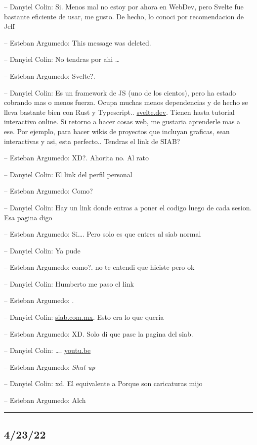 -- Danyiel Colin: Si. Menos mal no estoy por ahora en WebDev, pero
Svelte fue bastante eficiente de usar, me gusto. De hecho, lo conoci por
recomendacion de Jeff

-- Esteban Argumedo: This message was deleted.

-- Danyiel Colin: No tendras por ahi \ldots{}

-- Esteban Argumedo: Svelte?.

-- Danyiel Colin: Es un framework de JS (uno de los cientos), pero ha
estado cobrando mas o menos fuerza. Ocupa muchas menos dependencias y de
hecho se lleva bastante bien con Rust y Typescript..
\href{https://svelte.dev/tutorial/basics}{svelte.dev}. Tienen hasta
tutorial interactivo online. Si retorno a hacer cosas web, me gustaria
aprenderle mas a ese. Por ejemplo, para hacer wikis de proyectos que
incluyan graficas, sean interactivas y asi, esta perfecto.. Tendras el
link de SIAB?

-- Esteban Argumedo: XD?. Ahorita no. Al rato

-- Danyiel Colin: El link del perfil personal

-- Esteban Argumedo: Como?

-- Danyiel Colin: Hay un link donde entras a poner el codigo luego de
cada sesion. Esa pagina digo

-- Esteban Argumedo: Si\ldots. Pero solo es que entres al siab normal

-- Danyiel Colin: Ya pude

-- Esteban Argumedo: como?. no te entendi que hiciste pero ok

-- Danyiel Colin: Humberto me paso el link

-- Esteban Argumedo: .

-- Danyiel Colin: \href{http://siab.com.mx/}{siab.com.mx}. Esto era lo
que queria

-- Esteban Argumedo: XD. Solo di que pase la pagina del siab.

-- Danyiel Colin: \ldots. \href{https://youtu.be/1-Uz0LMbWpI}{youtu.be}

-- Esteban Argumedo: \emph{Shut up}

-- Danyiel Colin: xd. El equivalente a Porque son caricaturas mijo

-- Esteban Argumedo: Alch

\begin{center}\rule{0.5\linewidth}{0.5pt}\end{center}

\hypertarget{section-61}{%
\subsection{4/23/22}\label{section-61}}

